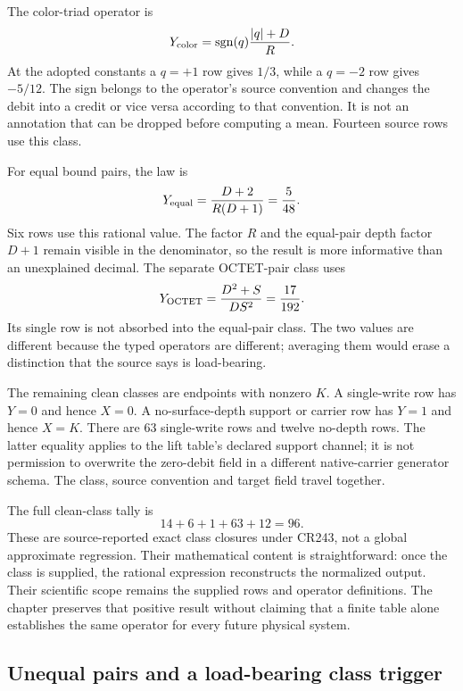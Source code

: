 The color-triad operator is
\begin{equation}
Y_{\rm color}=\operatorname{sgn}(q)\frac{|q|+D}{R}.
\label{v2c3:colorlift}
\end{equation}
At the adopted constants a $q=+1$ row gives $1/3$, while a $q=-2$ row gives $-5/12$. The sign belongs to the operator's source convention and changes the debit into a credit or vice versa according to that convention. It is not an annotation that can be dropped before computing a mean. Fourteen source rows use this class.

For equal bound pairs, the law is
\begin{equation}
Y_{\rm equal}=\frac{D+2}{R(D+1)}=\frac5{48}.
\end{equation}
Six rows use this rational value. The factor $R$ and the equal-pair depth factor $D+1$ remain visible in the denominator, so the result is more informative than an unexplained decimal. The separate OCTET-pair class uses
\begin{equation}
Y_{\rm OCTET}=\frac{D^2+S}{DS^2}=\frac{17}{192}.
\end{equation}
Its single row is not absorbed into the equal-pair class. The two values are different because the typed operators are different; averaging them would erase a distinction that the source says is load-bearing.

The remaining clean classes are endpoints with nonzero $K$. A single-write row has $Y=0$ and hence $X=0$. A no-surface-depth support or carrier row has $Y=1$ and hence $X=K$. There are 63 single-write rows and twelve no-depth rows. The latter equality applies to the lift table's declared support channel; it is not permission to overwrite the zero-debit field in a different native-carrier generator schema. The class, source convention and target field travel together.

The full clean-class tally is
\begin{equation}
14+6+1+63+12=96.
\end{equation}
These are source-reported exact class closures under CR243, not a global approximate regression. Their mathematical content is straightforward: once the class is supplied, the rational expression reconstructs the normalized output. Their scientific scope remains the supplied rows and operator definitions. The chapter preserves that positive result without claiming that a finite table alone establishes the same operator for every future physical system.

\subsection{Unequal pairs and a load-bearing class trigger}

